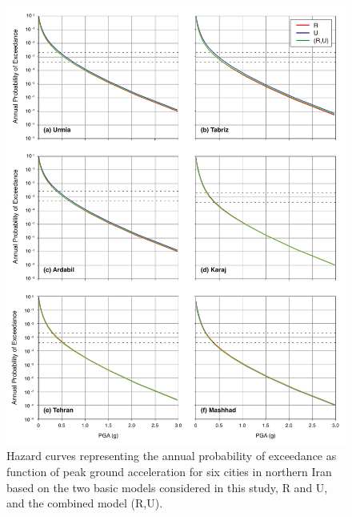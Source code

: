 \begin{figure}[th!]
    \centering
    \includegraphics[width=\textwidth]{figures/pdf/figure-11}
    \caption{Hazard curves representing the annual probability of exceedance as function of peak ground acceleration for six cities in northern Iran based on the two basic models considered in this study, R and U, and the combined model (R,U). }
    \label{fig:hazardcurve}
\end{figure}

